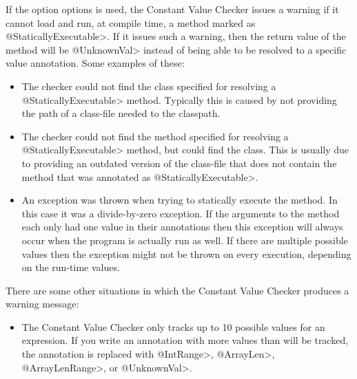 If the option  options is used, the Constant Value Checker issues a warning if it cannot load and run, at
compile time, a method marked as \<@StaticallyExecutable>.  If it issues
such a warning, then the return value of the method will be \<@UnknownVal>
instead of being able to be resolved to a specific value annotation.
Some examples of these:

\begin{sloppypar}
\begin{itemize}
\item {}

  The checker could not find the class
  specified for resolving a \<@StaticallyExecutable> method. Typically
  this is caused by not providing the path of a class-file needed to
  the classpath.

\item {}

  The checker could not find the method  specified for
  resolving a \<@StaticallyExecutable> method, but could find the
  class. This is usually due to providing an outdated version of the
  class-file that does not contain the
  method that was annotated as \<@StaticallyExecutable>.

\item {}

  An exception was thrown when trying to statically execute the
  method. In this case it was a divide-by-zero exception. If the
  arguments to the method each only had one value in their annotations
  then this exception will always occur when the program is actually
  run as well. If there are multiple possible values then the exception
  might not be thrown on every execution, depending on the run-time values.

\end{itemize}
\end{sloppypar}

There are some other situations in which the Constant Value Checker produces a
warning message:

\begin{sloppypar}
\begin{itemize}
\item {}

  The Constant Value Checker only tracks up to 10 possible values for an
  expression.  If you write an annotation with more values than will be
  tracked, the annotation is replaced with \<@IntRange>, \<@ArrayLen>, \<@ArrayLenRange>, or \<@UnknownVal>.

\end{itemize}
\end{sloppypar}


